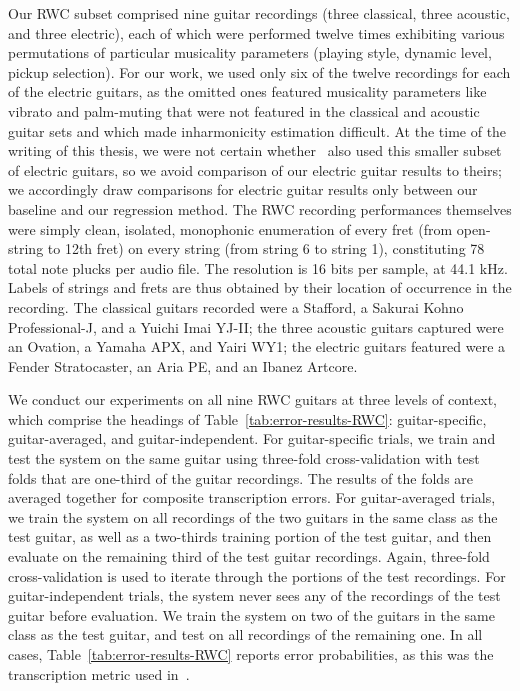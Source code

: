 \documentclass[12pt]{cmuthesis}
\begin{document}
Our RWC subset comprised nine guitar recordings (three classical, three acoustic, and three electric), each of which were performed twelve times exhibiting various permutations of particular musicality parameters (playing style, dynamic level, pickup selection). For our work, we used only six of the twelve recordings for each of the electric guitars, as the omitted ones featured musicality parameters like vibrato and palm-muting that were not featured in the classical and acoustic guitar sets and which made inharmonicity estimation difficult. At the time of the writing of this thesis, we were not certain whether~\cite{barbanchoi2012} also used this smaller subset of electric guitars, so we avoid comparison of our electric guitar results to theirs; we accordingly draw comparisons for electric guitar results only between our baseline and our regression method. The RWC recording performances themselves were simply clean, isolated, monophonic enumeration of every fret (from open-string to 12th fret) on every string (from string 6 to string 1), constituting 78 total note plucks per audio file. The resolution is 16 bits per sample, at 44.1 kHz. Labels of strings and frets are thus obtained by their location of occurrence in the recording. The classical guitars recorded were a Stafford, a Sakurai Kohno Professional-J, and a Yuichi Imai YJ-II; the three acoustic guitars captured were an Ovation, a Yamaha APX, and Yairi WY1; the electric guitars featured were a Fender Stratocaster, an Aria PE, and an Ibanez Artcore.


We conduct our experiments on all nine RWC guitars at three levels of context, which comprise the headings of Table~\ref{tab:error-results-RWC}: guitar-specific, guitar-averaged, and guitar-independent. For guitar-specific trials, we train and test the system on the same guitar using three-fold cross-validation with test folds that are one-third of the guitar recordings. The results of the folds are averaged together for composite transcription errors. For guitar-averaged trials, we train the system on all recordings of the two guitars in the same class as the test guitar, as well as a two-thirds training portion of the test guitar, and then evaluate on the remaining third of the test guitar recordings. Again, three-fold cross-validation is used to iterate through the portions of the test recordings. For guitar-independent trials, the system never sees any of the recordings of the test guitar before evaluation. We train the system on two of the guitars in the same class as the test guitar, and test on all recordings of the remaining one. In all cases, Table~\ref{tab:error-results-RWC} reports error probabilities, as this was the transcription metric used in~\cite{barbanchoi2012}.
\end{document}
